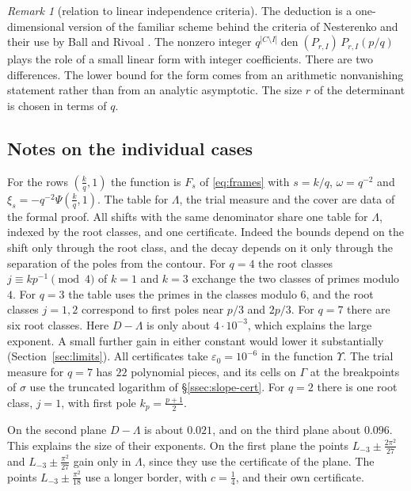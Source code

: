 \documentclass[11pt]{amsart}
\theoremstyle{definition}
\theoremstyle{remark}
\newtheorem{remark}[theorem]{Remark}
\numberwithin{equation}{section}
\newcommand{\den}{\operatorname{den}}
\newcommand{\Lt}{L_{-3}}             %
\begin{document}
\begin{remark}[relation to linear independence criteria]
The deduction is a one-dimensional version of the familiar scheme behind the criteria of Nesterenko
\cite{Nesterenko85} and their use by Ball and Rivoal \cite{BallRivoal01}. The nonzero integer
$q^{|C\setminus I|}\den(P_{r,I})\,P_{r,I}(p/q)$ plays the role of a small linear form with integer coefficients. There are
two differences. The lower bound for the form comes from an arithmetic nonvanishing statement rather than from an analytic
asymptotic. The size $r$ of the determinant is chosen in terms of $q$.
\end{remark}

\subsection{Notes on the individual cases}\label{sec:families}
For the rows $(\frac kq,1)$ the function is $F_s$ of \eqref{eq:frames} with $s=k/q$, $\omega=q^{-2}$ and
$\xi_s=-q^{-2}\Psi(\frac kq,1)$. The table for $\Lambda$, the trial measure and the cover are data of the formal proof. All
shifts with the same denominator share one table for $\Lambda$, indexed by the root classes, and one certificate. Indeed the
bounds depend on the shift only through the root class, and the decay depends on it only through the separation of the
poles from the contour. For $q=4$ the root classes $j\equiv kp^{-1}\pmod 4$ of $k=1$ and $k=3$ exchange the two classes of
primes modulo $4$. For $q=3$ the table uses the primes in the classes modulo $6$, and the root classes $j=1,2$ correspond to
first poles near $p/3$ and $2p/3$. For $q=7$ there are six root classes. Here $D-\Lambda$ is only about $4\cdot10^{-3}$,
which explains the large exponent. A small further gain in either constant would lower it substantially
(Section~\ref{sec:limits}). All certificates take $\varepsilon_0=10^{-6}$ in the function $\Upsilon$. The trial measure
for $q=7$ has $22$ polynomial pieces, and its cells on
$\Gamma$ at the breakpoints of $\sigma$ use the truncated logarithm of \S\ref{ssec:slope-cert}. For $q=2$ there is one root
class, $j=1$, with first pole $k_p=\frac{p+1}2$.

On the second plane $D-\Lambda$ is about $0.021$, and on the third plane about $0.096$. This explains the size of their
exponents. On the first plane the points $\Lt\pm\frac{2\pi^2}{27}$ and $\Lt\pm\frac{\pi^2}{27}$ gain only in $\Lambda$,
since they use the certificate of the plane. The points $\Lt\pm\frac{\pi^2}{18}$ use a longer border, with $c=\frac14$,
and their own certificate.
\end{document}

